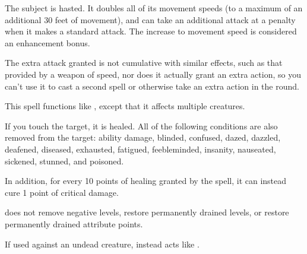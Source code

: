 \spelldur{\durshort}
\begin{spelleffect}
  The subject is hasted. It doubles all of its movement speeds (to a maximum of an additional 30 feet of movement), and can take an additional attack at a  penalty when it makes a standard attack. The increase to movement speed is considered an enhancement bonus.
\end{spelleffect}
\begin{spellnotes}
    The extra attack granted is not cumulative with similar effects, such as that provided by a weapon of speed, nor does it actually grant an extra action, so you can't use it to cast a second spell or otherwise take an extra action in the round.
\end{spellnotes}

\begin{spelleffect}
  This spell functions like , except that it affects multiple creatures.
\end{spelleffect}

\spellrng{\rngtouch}
\begin{spelleffect}
    If you touch the target, it is healed. All of the following conditions are also removed from the target: ability damage, blinded, confused, dazed, dazzled, deafened, diseased, exhausted, fatigued, feebleminded, insanity, nauseated, sickened, stunned, and poisoned.

  \par In addition, for every 10 points of healing granted by the spell, it can instead cure 1 point of critical damage.
\end{spelleffect}
\begin{spellnotes}
   does not remove negative levels, restore permanently drained levels, or restore permanently drained attribute points.
  \par If used against an undead creature,  instead acts like .
\end{spellnotes}

